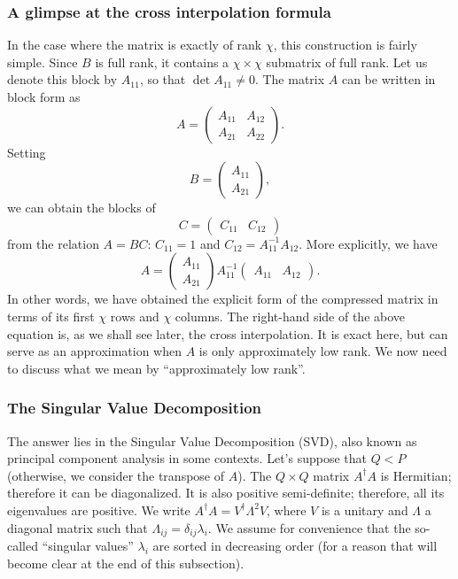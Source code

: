 \documentclass{SciPost}
\begin{document}
\subsubsection{A glimpse at the cross interpolation formula}
In the case where the matrix is exactly of rank $\chi$, this construction is fairly simple.
Since $B$ is full rank, it contains a $\chi\times\chi$ submatrix of full rank. Let us denote this block by $A_{11}$, so that $\det A_{11}\ne 0$.
The matrix $A$ can be written in block form as
\begin{equation}
A =
\begin{pmatrix}
A_{11} & A_{12} \\
A_{21} & A_{22}
\end{pmatrix}.
\end{equation}
Setting
\begin{equation}
B =
\begin{pmatrix}
A_{11} \\
A_{21}
\end{pmatrix},
\end{equation}
we can obtain the blocks of
\begin{equation}
C =
\begin{pmatrix}
C_{11} & C_{12}
\end{pmatrix}
\end{equation}
from the relation $A=BC$: $C_{11}=1$ and $C_{12}=A_{11}^{-1}A_{12}$.
More explicitly, we have
\begin{equation}
A =
\begin{pmatrix}
A_{11} \\
A_{21}
\end{pmatrix}
A_{11}^{-1}
\begin{pmatrix}
A_{11} & A_{12}
\end{pmatrix}.
\end{equation}
In other words, we have obtained the explicit form of the compressed matrix in terms of its first
$\chi$ rows and $\chi$ columns. The right-hand side of the above equation is, as we shall see later, the cross interpolation. It is exact here, but can serve as an approximation
when $A$ is only approximately low rank. We now need to discuss what we mean
by ``approximately low rank''.

\subsubsection{The Singular Value Decomposition}
The answer lies in the Singular Value Decomposition (SVD), also known as principal component
analysis in some contexts. Let's suppose that $Q<P$ (otherwise, we consider the transpose of $A$). The $Q\times Q$ matrix $A^\dagger A$ is Hermitian; therefore it can be diagonalized. It is also positive semi-definite; therefore, all its eigenvalues are positive.
We write $A^\dagger A = V^\dagger \Lambda^2 V$, where $V$ is a unitary and $\Lambda$ a diagonal
matrix such that $\Lambda_{ij} = \delta_{ij} \lambda_i$. We assume for convenience that the so-called ``singular values'' $\lambda_i$ are sorted in decreasing order
(for a reason that will become clear at the end of this subsection).
\end{document}

